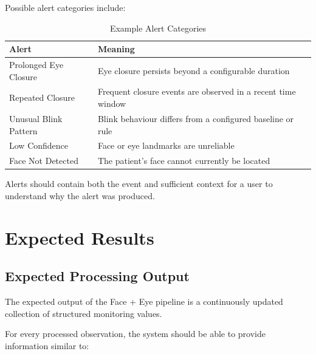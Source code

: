 \documentclass[12pt]{tietreport}
\begin{document}
Possible alert categories include:

\begin{table}[H]
\centering
\caption{Example Alert Categories}
\begin{tabular}{p{}p{}}
\toprule
\textbf{Alert} & \textbf{Meaning} \\
\midrule
Prolonged Eye Closure & Eye closure persists beyond a configurable duration \\
Repeated Closure & Frequent closure events are observed in a recent time window \\
Unusual Blink Pattern & Blink behaviour differs from a configured baseline or rule \\
Low Confidence & Face or eye landmarks are unreliable \\
Face Not Detected & The patient's face cannot currently be located \\
\bottomrule
\end{tabular}
\end{table}

Alerts should contain both the event and sufficient context for a
user to understand why the alert was produced.


\chapter{Expected Results}

\section{Expected Processing Output}

The expected output of the Face + Eye pipeline is a continuously
updated collection of structured monitoring values.

For every processed observation, the system should be able to provide
information similar to:
\end{document}
